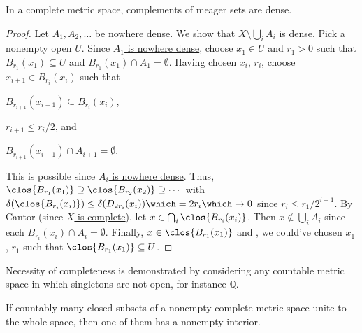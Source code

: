	\begin{thm}\label{THM: BCT}
		In a complete metric space, complements of meager sets are dense.
	\end{thm}
	
	\begin{proof}
		Let $A_1, A_2, \ldots$ be nowhere dense. We show that $X\setminus \bigcup_i A_i$ is dense. Pick a nonempty open $U$. Since \uline{$A_1$ is nowhere dense}, choose $x_1\in U$ and $r_1 > 0$ such that $B_{r_1}(x_1)\subseteq U$ and $B_{r_1}(x_1)\cap A_1 = \emptyset$. Having chosen
		$x_i$, $r_i$, choose $x_{i + 1}\in B_{r_i}(x_i)$ such that
		\begin{assmplist}
			\item $B_{r_{i + 1}}(x_{i + 1})\subseteq B_{r_i}(x_i)$,
			\item $r_{i + 1}\le r_i/2$, and
			\item $B_{r_{i + 1}}(x_{i + 1})\cap A_{i + 1} = \emptyset$.
		\end{assmplist}
		This is possible since \uline{$A_i$ is nowhere dense}.
		Thus, $\clos{B_{r_1}(x_1)}\supseteq\clos{B_{r_2}(x_2)}\supseteq\cdots$ with $\delta(\clos{B_{r_i}(x_i)})\le\delta(D_{2r_i}(x_i)) \which = 2r_i\which\to 0$ since $r_i\le r_1/2^{i - 1}$. By Cantor (since \uline{$X$ is complete}), let $x\in\bigcap_i\clos{B_{r_i}(x_i)}$. Then $x\notin \bigcup_i A_i$ since each $B_{r_i}(x_i)\cap A_i = \emptyset$. Finally, $x\in \clos{B_{r_1}(x_1)}$ and \wlogg, we could've chosen $x_1$, $r_1$ such that $\clos{B_{r_1}(x_1)}\subseteq U$.
	\end{proof}
	
	\begin{rmk}
		Necessity of completeness is demonstrated by considering any countable metric space in which singletons are not open, for instance $\mathbb Q$.
	\end{rmk}
	
	\begin{cor}
		If countably many closed subsets of a nonempty complete metric space unite to the whole space, then one of them has a nonempty interior.
	\end{cor}
	
	
	
	
	
	
	
	
	
	
	
	